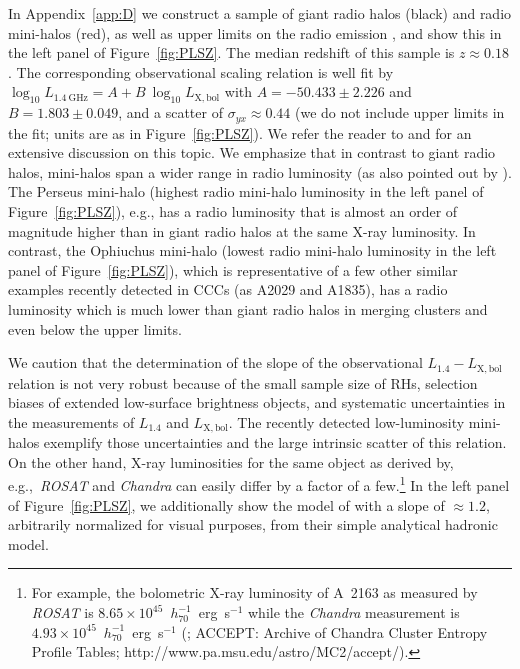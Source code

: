 \documentclass[traditabstract]{aa}
\newcommand{\rmn}{\mathrm}
\begin{document}
In Appendix~\ref{app:D} we construct a sample of giant
radio halos (black) and radio mini-halos (red), as well as upper limits on the
radio emission \citep{2009A&A...507..661B, 2011A&A...527A..99E,
  2009A&A...499..371G}, and show this in the left panel of
Figure~\ref{fig:PLSZ}. The median redshift of this sample is $z\approx0.18$. The
corresponding observational scaling relation is well fit by $\log_{10}
L_{1.4~\rmn{GHz}} = A + B~\log_{10} L_{\rmn{X,bol}}$ with $A=-50.433\pm2.226$
and $B=1.803\pm0.049$, and a scatter of $\sigma_{yx} \approx 0.44$ (we do not
include upper limits in the fit; units are as in Figure~\ref{fig:PLSZ}). We
refer the reader to \cite{2009A&A...507..661B} and \cite{2011A&A...527A..99E}
for an extensive discussion on this topic. We emphasize that in contrast to
giant radio halos, mini-halos span a wider range in radio luminosity (as also
pointed out by \citealp{2009A&A...499..679M}). The Perseus mini-halo (highest radio
mini-halo luminosity in the left panel of Figure~\ref{fig:PLSZ}), e.g., has a
radio luminosity that is almost an order of magnitude higher than in giant radio
halos at the same X-ray luminosity. In contrast, the Ophiuchus mini-halo (lowest
radio mini-halo luminosity in the left panel of Figure~\ref{fig:PLSZ}), which is
representative of a few other similar examples recently detected in CCCs
(as A2029 and A1835), has a radio luminosity which is much lower than giant
radio halos in merging clusters and even below the upper limits. 

We caution that the determination of the slope of the observational
$L_{1.4}-L_{\rmn{X,bol}}$ relation is not very robust because of the small
sample size of RHs, selection biases of extended low-surface brightness objects,
and systematic uncertainties in the measurements of $L_{1.4}$ and
$L_{\rmn{X,bol}}$. The recently detected low-luminosity mini-halos exemplify
those uncertainties and the large intrinsic scatter of this relation. On the
other hand, X-ray luminosities for the same object as derived by,
e.g.,~\emph{ROSAT} and \emph{Chandra} can easily differ by a factor of a
few.\footnote{For example, the bolometric X-ray luminosity of A~2163 as measured
  by \emph{ROSAT} is $8.65\times10^{45}$~$h_{70}^{-1}$~erg~s$^{-1}$
  \citep{2009A&A...507..661B} while the \emph{Chandra} measurement is
  $4.93\times10^{45}$~$h_{70}^{-1}$~erg~s$^{-1}$ (\citealp{2009ApJS..182...12C};
  ACCEPT: Archive of Chandra Cluster Entropy Profile Tables;
  http://www.pa.msu.edu/astro/MC2/accept/).}  In the left panel of
Figure~\ref{fig:PLSZ}, we additionally show the model of
\citet{2009JCAP...09..024K} with a slope of $\approx1.2$, arbitrarily normalized
for visual purposes, from their simple analytical hadronic model.
\end{document}
